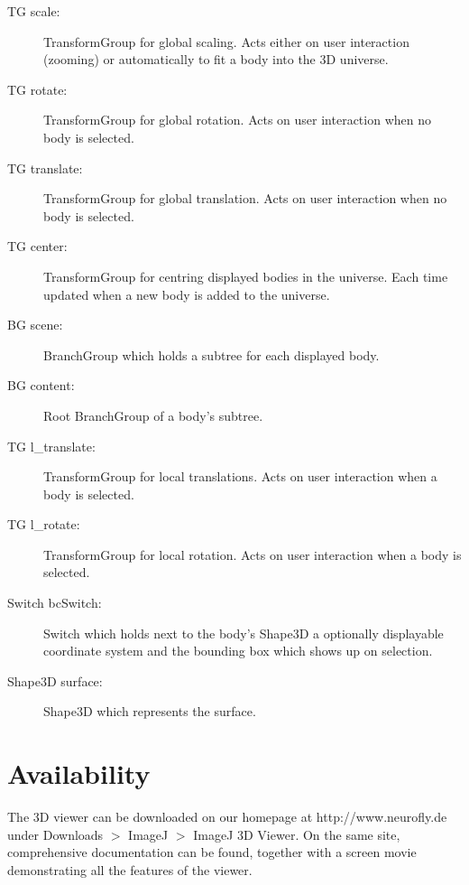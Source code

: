 \documentclass[a4paper,10pt]{article}
\begin{document}
\begin{description}
\item[TG scale:] TransformGroup for global scaling. Acts either on user interaction (zooming) or automatically to fit a body into the 3D universe.
\item[TG rotate:] TransformGroup for global rotation. Acts on user interaction when no body is selected.
\item[TG translate:] TransformGroup for global translation. Acts on user interaction when no body is selected.
\item[TG center:] TransformGroup for centring displayed bodies in the universe. Each time updated when a new body is added to the universe.
\item[BG scene:] BranchGroup which holds a subtree for each displayed body.
\item[BG content:] Root BranchGroup of a body's subtree.
\item[TG l\_translate:]  TransformGroup for local translations. Acts on user interaction when a body is selected.
\item[TG l\_rotate:] TransformGroup for local rotation. Acts on user interaction when a body is selected.
\item[Switch bcSwitch:] Switch which holds next to the body's Shape3D a optionally displayable coordinate system and the bounding box which shows up on selection.
\item[Shape3D surface:] Shape3D which represents the surface.
\end{description}



\section{Availability}
The 3D viewer can be downloaded on our homepage at http://www.neurofly.de under Downloads $>$ ImageJ $>$ ImageJ 3D Viewer. On the same site, comprehensive documentation can be found, together with a screen movie demonstrating all the features of the viewer.






\end{document}
